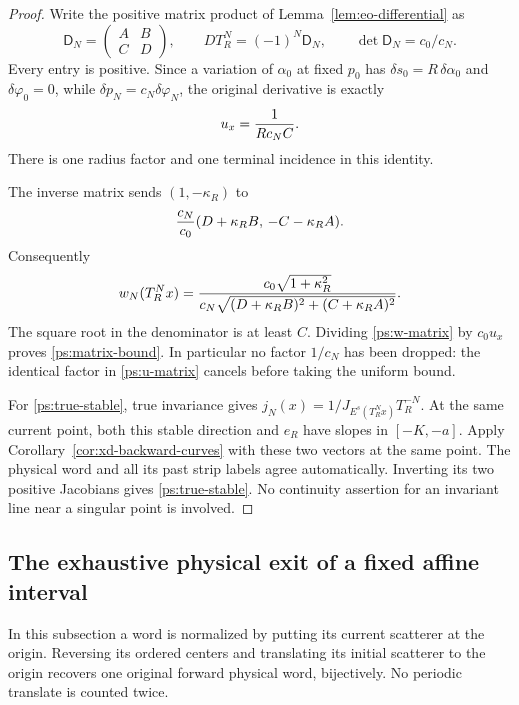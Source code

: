 \begin{proof}
Write the positive matrix product of Lemma~\ref{lem:eo-differential}
as
\[
 \mathsf D_N=\begin{pmatrix}A&B\\ C&D\end{pmatrix},\qquad
 D T_R^N=(-1)^N\mathsf D_N,\qquad
 \det\mathsf D_N=c_0/c_N.
\]
Every entry is positive.  Since a variation of $\alpha_0$ at fixed
$p_0$ has $\delta s_0=R\,\delta\alpha_0$ and
$\delta\varphi_0=0$, while $\delta p_N=c_N\delta\varphi_N$, the
original derivative is exactly
\begin{equation}\label{ps:u-matrix}
                 u_x={1\over R c_N C}.
\end{equation}
There is one radius factor and one terminal incidence in this
identity.

The inverse matrix sends $(1,-\kappa_R)$ to
\[
 {c_N\over c_0}
       (D+\kappa_R B,\,-C-\kappa_R A).
\]
Consequently
\begin{equation}\label{ps:w-matrix}
 w_N(T_R^Nx)
  ={c_0\sqrt{1+\kappa_R^2}\over
      c_N\sqrt{(D+\kappa_R B)^2+(C+\kappa_R A)^2}}.
\end{equation}
The square root in the denominator is at least $C$.
Dividing \eqref{ps:w-matrix} by $c_0u_x$ proves
\eqref{ps:matrix-bound}.  In particular no factor $1/c_N$ has
been dropped: the identical factor in \eqref{ps:u-matrix} cancels
before taking the uniform bound.

For \eqref{ps:true-stable}, true invariance gives
$j_N(x)=1/J_{E^s(T_R^Nx)}T_R^{-N}$.
At the same current point, both this stable direction and $e_R$
have slopes in $[-K,-a]$.  Apply
Corollary~\ref{cor:xd-backward-curves} with these two vectors at
the same point.  The physical word and all its past strip labels
agree automatically.  Inverting its two positive Jacobians gives
\eqref{ps:true-stable}.  No continuity assertion for an invariant
line near a singular point is involved.
\end{proof}

\subsection{The exhaustive physical exit of a fixed affine interval}

In this subsection a word is normalized by putting its current
scatterer at the origin.  Reversing its ordered centers and translating
its initial scatterer to the origin recovers one original forward
physical word, bijectively.  No periodic translate is counted twice.

